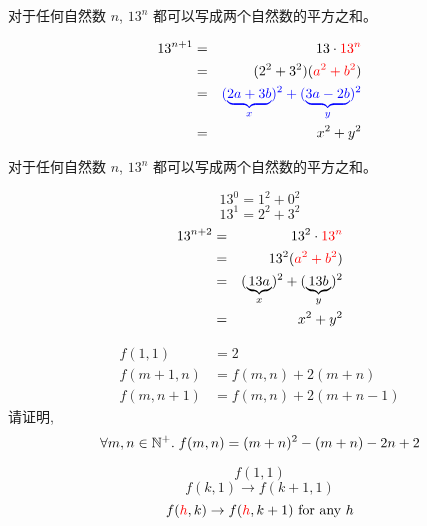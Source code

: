 
\begin{frame}{}
  \begin{theorem}
    对于任何自然数 $n$, $13^{n}$ 都可以写成两个自然数的平方之和。
  \end{theorem}

  \begin{eqnarray*}
    13^{n+1} &=& 13 \cdot \textcolor{red}{13^n} \\
    &=& (2^2+3^2)(\textcolor{red}{a^2 + b^2}) \\
    &=& \textcolor{blue}{(\underbrace{2a+3b}_x)^2 + (\underbrace{3a-2b}_y)^2} \\
    &=& x^2+y^2
  \end{eqnarray*}
\end{frame}

\begin{frame}{}
  \begin{theorem}
    对于任何自然数 $n$, $13^{n}$ 都可以写成两个自然数的平方之和。
  \end{theorem}

  \pause
  \[
    13^0 = 1^2 + 0^2
  \]
  \pause
  \[
    13^1 = 2^2 + 3^2
  \]
  \pause
  \begin{eqnarray*}
    13^{n+2} &=& 13^2\cdot \textcolor{red}{13^n} \\
    &=& 13^2(\textcolor{red}{a^2 + b^2}) \\
    &=& (\underbrace{13a}_x)^2 + (\underbrace{13b}_y)^2 \\
    &=& x^2+y^2
  \end{eqnarray*}
\end{frame}

\begin{frame}{}
  \begin{exampleblock}{}
    \begin{align*}
      f(1, 1) &= 2 \\
      f(m+1, n) &= f(m,n) + 2(m+n) \\
      f(m, n+1) &= f(m,n) + 2(m+n-1)
    \end{align*}
    请证明,
    \[
      \forall m, n \in \mathbb{N}^{+}.\; f(m,n) = (m+n)^{2} - (m+n) - 2n + 2
    \]
  \end{exampleblock}

  \pause
  \begin{center}

    \pause
    \[
      f(1, 1)
    \]
    \pause
    \[
      f(k, 1) \to f(k+1, 1)
    \]
    \pause
    \[
      f(\textcolor{red}{h}, k) \to f(\textcolor{red}{h}, k+1) \text{ for any } h
    \]
  \end{center}
\end{frame}

